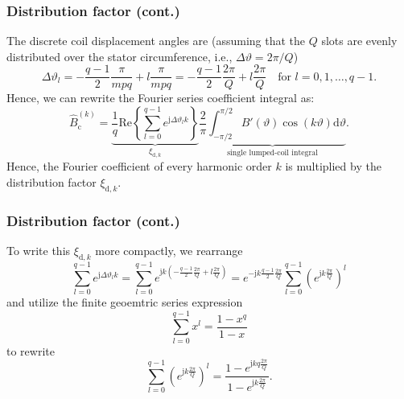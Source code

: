 \begin{frame}
	\frametitle{Distribution factor  (cont.)}
   The discrete coil displacement angles are (assuming that the $Q$ slots are evenly distributed over the stator circumference, i.e., $\Delta \vartheta = 2\pi/Q$)
   \begin{equation}
    \Delta\vartheta_l = -\frac{q-1}{2} \frac{\pi}{m p q} + l \frac{\pi}{m p q} = -\frac{q-1}{2} \frac{2\pi}{Q} + l \frac{2\pi}{Q} \quad \mbox{for } l=0,1,\ldots,q-1.
   \end{equation}
   Hence, we can rewrite the Fourier series coefficient integral as:
   \begin{equation}
    \hat{B}_{\mathrm{c}}^{(k)} = \underbrace{\frac{1}{q}\mathrm{Re}\left\{\sum_{l=0}^{q-1} e^{\mathrm{j} \Delta\vartheta_l k}\right\} }_{\xi_{\mathrm{d},k}} \underbrace{\frac{2}{\pi}\int_{-\pi/2}^{\pi/2} B'(\vartheta) \cos(k \vartheta) \mathrm{d}\vartheta}_{\mbox{single lumped-coil integral}}.
\end{equation}
Hence, the Fourier coefficient of every harmonic order $k$ is multiplied by the distribution factor $\xi_{\mathrm{d},k}$. 
\end{frame}

\begin{frame}
	\frametitle{Distribution factor  (cont.)}
    To write this $\xi_{\mathrm{d},k}$ more compactly, we rearrange 
    \begin{equation}
        \sum_{l=0}^{q-1} e^{\mathrm{j} \Delta\vartheta_l k} = \sum_{l=0}^{q-1} e^{\mathrm{j} k (-\frac{q-1}{2} \frac{2\pi}{Q} + l \frac{2\pi}{Q})} = e^{- \mathrm{j} k \frac{q-1}{2} \frac{2\pi}{Q}} \sum_{l=0}^{q-1} \left(e^{\mathrm{j} k  \frac{2\pi}{Q}}\right)^l
        \label{eq:sum_exp_distribution_factor}
    \end{equation}
    and utilize the finite geoemtric series expression
    $$
    \sum_{l=0}^{q-1} x^l = \frac{1-x^q}{1-x}
    $$
    to rewrite
    $$
    \sum_{l=0}^{q-1} \left(e^{\mathrm{j} k  \frac{2\pi}{Q}}\right)^l = \frac{1-e^{\mathrm{j} k q \frac{2\pi}{Q}}}{1-e^{\mathrm{j} k \frac{2\pi}{Q}}}.
    $$
\end{frame}

